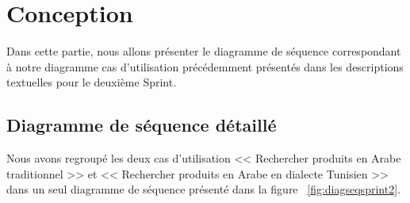\section{Conception}
\noindent
Dans cette partie, nous allons présenter le diagramme de séquence correspondant à notre diagramme cas d'utilisation précédemment présentés dans les descriptions textuelles pour le deuxième Sprint.

\subsection{Diagramme de séquence détaillé}
\noindent
Nous avons regroupé les deux cas d'utilisation << Rechercher produits en Arabe traditionnel >> et << Rechercher produits en Arabe en dialecte Tunisien >> dans un seul diagramme de séquence présenté dans la figure ~\ref{fig:diagseqsprint2}.


